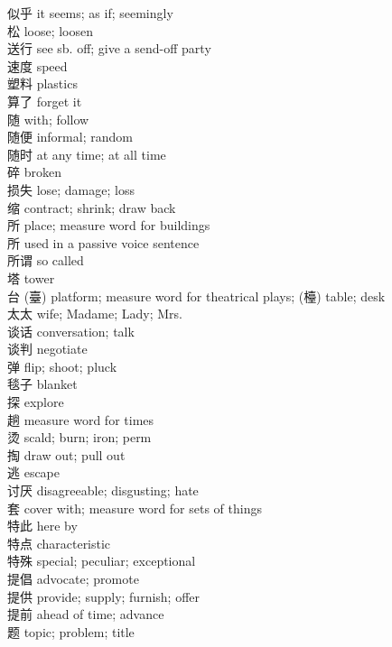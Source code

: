 似乎 \quad it seems; as if; seemingly\\
松 \quad loose; loosen\\
送行 \quad see sb. off; give a send-off party\\
速度 \quad speed\\
塑料 \quad plastics\\
算了 \quad forget it\\
随 \quad with; follow\\
随便 \quad informal; random\\
随时 \quad at any time; at all time\\
碎 \quad broken\\
损失 \quad lose; damage; loss\\
缩 \quad contract; shrink; draw back\\
所 \quad place; measure word for buildings\\
所 \quad used in a passive voice sentence\\
所谓 \quad so called\\
塔 \quad tower\\
台 \quad (臺) platform; measure word for theatrical plays; (檯) table; desk\\
太太 \quad wife; Madame; Lady; Mrs.\\
谈话 \quad conversation; talk\\
谈判 \quad negotiate\\
弹 \quad flip; shoot; pluck\\
毯子 \quad blanket\\
探 \quad explore\\
趟 \quad measure word for times\\
烫 \quad scald; burn; iron; perm\\
掏 \quad draw out; pull out\\
逃 \quad escape\\
讨厌 \quad disagreeable; disgusting; hate\\
套 \quad cover with; measure word for sets of things\\
特此 \quad here by\\
特点 \quad characteristic\\
特殊 \quad special; peculiar; exceptional\\
提倡 \quad advocate; promote\\
提供 \quad provide; supply; furnish; offer\\
提前 \quad ahead of time; advance\\
题 \quad topic; problem; title\\
